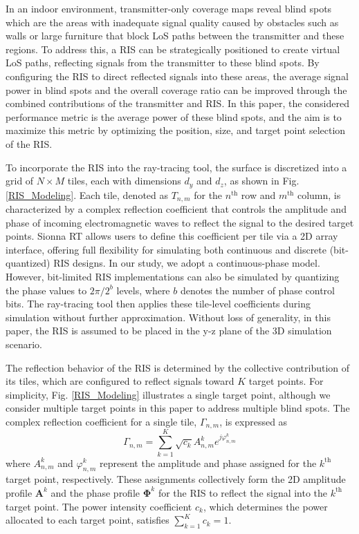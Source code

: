 \documentclass{IEEEoj}
\begin{document}
In an indoor environment, transmitter-only coverage maps reveal blind spots which are the areas with inadequate signal quality caused by obstacles such as walls or large furniture that block LoS paths between the transmitter and these regions. To address this, a RIS can be strategically positioned to create virtual LoS paths, reflecting signals from the transmitter to these blind spots. By configuring the RIS to direct reflected signals into these areas, the average signal power in blind spots and the overall coverage ratio can be improved through the combined contributions of the transmitter and RIS. In this paper, the considered performance metric is the average power of these blind spots, and the aim is to maximize this metric by optimizing the position, size, and target point selection of the RIS.

To incorporate the RIS into the ray-tracing tool, the surface is discretized into a grid of $N \times M$ tiles, each with dimensions $d_y$ and $d_z$, as shown in Fig. \ref{RIS_Modeling}. Each tile, denoted as $T_{n,m}$ for the $n^{\text{th}}$ row and $m^{\text{th}}$ column, is characterized by a complex reflection coefficient that controls the amplitude and phase of incoming electromagnetic waves to reflect the signal to the desired target points. Sionna RT allows users to define this coefficient per tile via a 2D array interface, offering full flexibility for simulating both continuous and discrete (bit-quantized) RIS designs. In our study, we adopt a continuous-phase model. However, bit-limited RIS implementations can also be simulated by quantizing the phase values to $2\pi/2^b$ levels, where $b$ denotes the number of phase control bits. The ray-tracing tool then applies these tile-level coefficients during simulation without further approximation. Without loss of generality, in this paper, the RIS is assumed to be placed in the y-z plane of the 3D simulation scenario.

The reflection behavior of the RIS is determined by the collective contribution of its tiles, which are configured to reflect signals toward $K$ target points. For simplicity, Fig. \ref{RIS_Modeling} illustrates a single target point, although we consider multiple target points in this paper to address multiple blind spots. The complex reflection coefficient for a single tile, $\Gamma_{n,m}$, is expressed as
\begin{equation} \label{ref_coef_exp}
	\Gamma_{n,m} = \sum \limits_{k=1}^K \sqrt{c_k} A_{n,m}^k e^{j \varphi_{n,m}^k}
\end{equation}
where $A_{n,m}^k$ and $\varphi_{n,m}^k$ represent the amplitude and phase assigned for the $k^{\text{th}}$ target point, respectively. These assignments collectively form the 2D amplitude profile $\mathbf{A}^k$ and the phase profile $\mathbf{\Phi}^k$ for the RIS to reflect the signal into the $k^{\text{th}}$ target point. The power intensity coefficient $c_k$, which determines the power allocated to each target point, satisfies $\sum_{k=1}^K c_k = 1$.
\end{document}
